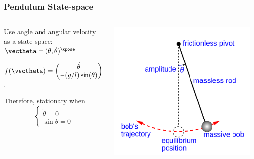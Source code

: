 \documentclass[12pt]{beamer}
\begin{document}
\begin{frame}
\frametitle{Pendulum State-space}

\begin{columns}

\begin{itemize}

\vitem
Use angle and angular velocity as a state-space:
$\vectheta = (\theta, \dot \theta)^\xpose$

\vitem
$f(\vectheta)
	= \begin{pmatrix}
		\dot\theta \\
		-(g/l) \sin(\theta)
	\end{pmatrix}$.

\vitem Therefore, stationary when
\[
\begin{cases}
\dot\theta = 0 \\
\sin \theta = 0
\end{cases}
\]

\end{itemize}
\vfill\null


\includegraphics[width=\linewidth]{pic/Simple_gravity_pendulum.png}

\end{columns}

\end{frame}
\end{document}
